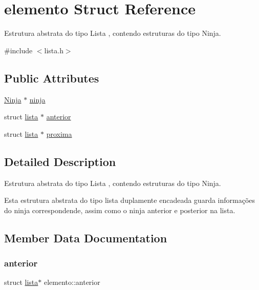 \hypertarget{structelemento}{}\section{elemento Struct Reference}
\label{structelemento}


Estrutura abstrata do tipo Lista , contendo estruturas do tipo Ninja.  




{\ttfamily \#include $<$lista.\+h$>$}

\subsection*{Public Attributes}
\begin{DoxyCompactItemize}
\item 
\mbox{\hyperlink{structninja}{Ninja}} $\ast$ \mbox{\hyperlink{structelemento_af16aea73cc75aa4568de78596150bc05}{ninja}}
\item 
struct \mbox{\hyperlink{structlista}{lista}} $\ast$ \mbox{\hyperlink{structelemento_a4dbbd640d14a2b1cfa1cc0855daf1e3d}{anterior}}
\item 
struct \mbox{\hyperlink{structlista}{lista}} $\ast$ \mbox{\hyperlink{structelemento_a71d7ad5e15a4311eac4f33dc4b5d31d4}{proxima}}
\end{DoxyCompactItemize}


\subsection{Detailed Description}
Estrutura abstrata do tipo Lista , contendo estruturas do tipo Ninja. 

Esta estrutura abstrata do tipo lista duplamente encadeada guarda informações do ninja correspondende, assim como o ninja anterior e posterior na lista. 

\subsection{Member Data Documentation}
\mbox{\label{structelemento_a4dbbd640d14a2b1cfa1cc0855daf1e3d}} 
\subsubsection{\texorpdfstring{anterior}{anterior}}
{\footnotesize\ttfamily struct \mbox{\hyperlink{structlista}{lista}}$\ast$ elemento\+::anterior}

